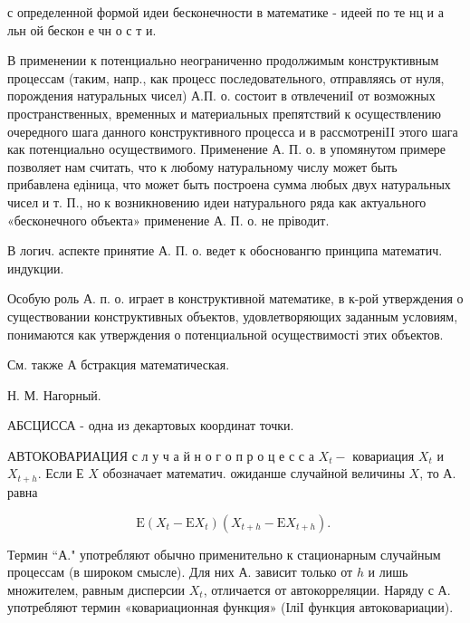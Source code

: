 \documentclass[10pt]{article}
\begin{document}
с определенной формой идеи бесконечности в математике - идеей по те нц и а льн ой бескон е чн о с т и.



В применении к потенциально неограниченно продолжимым конструктивным процессам (таким, напр., как процесс последовательного, отправляясь от нуля, порождения натуральных чисел) А.П. о. состоит в отвлечениіІ от возможных пространственных, временных и материальных препятствий к осуществлению очередного шага данного конструктивного процесса и в рассмотреніII этого шага как потенциально осуществимого. Применение А. П. о. в упомянутом примере позволяет нам считать, что к любому натуральному числу может быть прибавлена едіница, что может быть построена сумма любых двух натуральных чисел и т. П., но к возникновению идеи натурального ряда как актуального «бесконечного объекта» применение А. П. о. не пріводит.



В логич. аспекте принятие А. П. о. ведет к обосновангю принципа математич. индукции.



Особую роль А. п. о. играет в конструктивной математике, в к-рой утверждения о существовании конструктивных объектов, удовлетворяющих заданным условиям, понимаются как утверждения о потенциальной осуществимості этих объектов.



См. также $А$ бстракция математическая.



Н. М. Нагорный.



АБСЦИССА - одна из декартовых координат точки.



АВТОКОВАРИАЦИЯ с л у ч а й н о г о п р о ц е с с а $X_{t}-$ ковариация $X_{t}$ и $X_{t+h}$. Если Е $X$ обозначает математич. ожиданше случайной величины $X$, то А. равна



\[

\mathrm{E}\left(X_{t}-\mathrm{E} X_{t}\right)\left(X_{t+h}-\mathrm{E} X_{t+h}\right) \text {. }

\]



Термин “А." употребляют обычно применительно к стационарным случайным процессам (в широком смысле). Для них А. зависит только от $h$ и лишь множителем, равным дисперсии $X_{t}$, отличается от автокорреляции. Наряду с А. употребляют термин «ковариационная функция» (ІліІ функция автоковариации).
\end{document}
